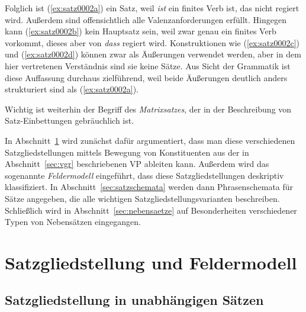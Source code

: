 Folglich ist (\ref{ex:satz0002a}) ein Satz, weil \textit{ist} ein finites Verb ist, das nicht regiert wird.
Außerdem sind offensichtlich alle Valenzanforderungen erfüllt.
Hingegen kann (\ref{ex:satz0002b}) kein Hauptsatz sein, weil zwar genau ein finites Verb vorkommt, dieses aber von \textit{dass} regiert wird.
Konstruktionen wie (\ref{ex:satz0002c}) und (\ref{ex:satz0002d}) können zwar als Äußerungen verwendet werden, aber in dem hier vertretenen Verständnis sind sie keine Sätze.
Aus Sicht der Grammatik ist diese Auffassung durchaus zielführend, weil beide Äußerungen deutlich anders strukturiert sind als (\ref{ex:satz0002a}).

\begin{exe}
  \ex\label{ex:satz0002} 
  \begin{xlist}
  \end{xlist}
\end{exe}

Wichtig ist weiterhin der Begriff des \textit{Matrixsatzes}, der in der Beschreibung von Satz-Einbettungen gebräuchlich ist.


In Abschnitt~\ref{sec:felder} wird zunächst dafür argumentiert, dass man diese verschiedenen Satzgliedstellungen mittels Bewegung von Konstituenten aus der in Abschnitt~\ref{sec:vgr} beschriebenen VP ableiten kann.
Außerdem wird das sogenannte \textit{Feldermodell} eingeführt, dass diese Satzgliedstellungen deskriptiv klassifiziert.
In Abschnitt~\ref{sec:satzschemata} werden dann Phrasenschemata für Sätze angegeben, die alle wichtigen Satzgliedstellungsvarianten beschreiben.
Schließlich wird in Abschnitt~\ref{sec:nebensaetze} auf Besonderheiten verschiedener Typen von Nebensätzen eingegangen.

\section{Satzgliedstellung und Feldermodell}

\label{sec:felder}

\subsection{Satzgliedstellung in unabhängigen Sätzen}

